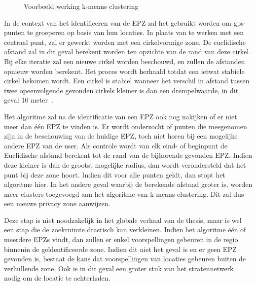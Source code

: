 \begin{figure}[h]
\begin{subfigure}[b]{.33\textwidth}
    \end{subfigure}
    \caption{Voorbeeld werking k-means clustering~\cite{InDepthk59:online}}\label{fig:kmeans}
\end{figure}

In de context van het identificeren van de \ac{EPZ} zal het gebruikt worden om
\ac{gps}-punten te groeperen op basis van hun locaties. In plaats van te werken
met een centraal punt, zal er gewerkt worden met een cirkelvormige zone. De
euclidische afstand zal in dit geval berekent worden ten opzichte van de rand
van deze cirkel. Bij elke iteratie zal een nieuwe cirkel worden beschouwd, en
zullen de afstanden opnieuw worden berekent. Het proces wordt herhaald totdat
een ietwat stabiele cirkel bekomen wordt. Een cirkel is stabiel wanneer het
verschil in afstand tussen twee opeenvolgende gevonden cirkels kleiner is dan
een drempelwaarde, in dit geval 10 meter~\cite{Dhondt, Verdonck_2022}.

Het algoritme zal na de identificatie van een \ac{EPZ} ook nog nakijken of er
niet meer dan één \ac{EPZ} te vinden is. Er wordt onderzocht of punten die
meegenomen zijn in de beschouwing van de huidige \ac{EPZ}, toch niet horen bij
een mogelijke andere \ac{EPZ} van de user. Als controle wordt van elk eind- of
beginpunt de Euclidische afstand berekent tot de rand van de bijhorende
gevonden \ac{EPZ}. Indien deze kleiner is dan de grootst mogelijke radius, dan
wordt verondersteld dat het punt bij deze zone hoort. Indien dit voor alle
punten geldt, dan stopt het algoritme hier. In het andere geval waarbij de
berekende afstand groter is, worden meer clusters toegevoegd aan het algoritme
van k-means clustering. Dit zal dus een nieuwe privacy zone aanwijzen.

Deze stap is niet noodzakelijk in het globale verhaal van de thesis, maar is
wel een stap die de zoekruimte drastisch kan verkleinen. Indien het algoritme
één of meerdere \acp{EPZ} vindt, dan zullen er enkel voorspellingen gebeuren in
de regio binnenin de geïdentificeerde zone. Indien dit niet het geval is en er
geen \ac{EPZ} gevonden is, bestaat de kans dat voorspellingen van locaties
gebeuren buiten de verhullende zone. Ook is in dit geval een groter stuk van
het stratennetwerk nodig om de locatie te achterhalen.

